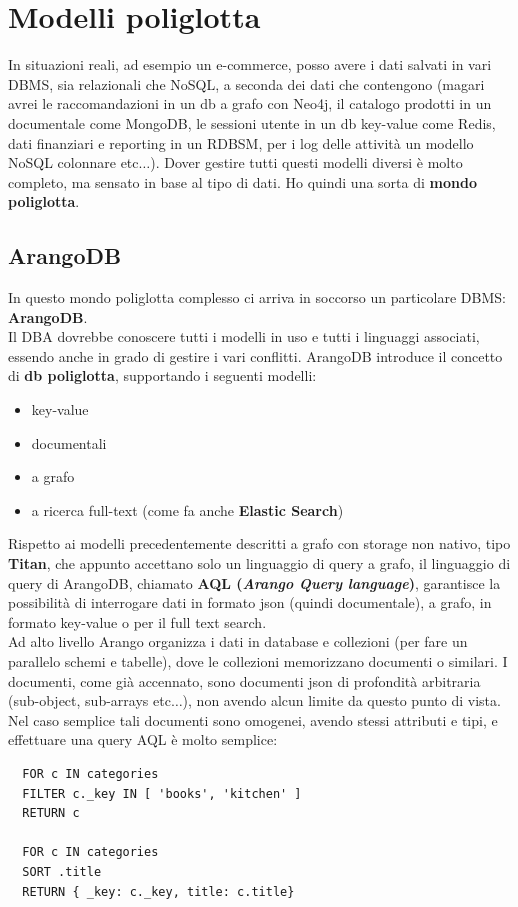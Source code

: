 \documentclass[a4paper,12pt, oneside]{book}
\begin{document}
\section{Modelli poliglotta}
In situazioni reali, ad esempio un e-commerce, posso avere i dati salvati in
vari DBMS, sia relazionali che NoSQL, a seconda dei dati che contengono (magari
avrei le raccomandazioni in un db a grafo con Neo4j, il catalogo prodotti in un
documentale come MongoDB, le sessioni utente in un db key-value come Redis,
dati finanziari e reporting in un RDBSM, per i log delle attività un modello
NoSQL colonnare etc$\ldots$). Dover gestire tutti questi modelli diversi è molto
completo, ma sensato in base al tipo di dati. Ho quindi una sorta di
\textbf{mondo poliglotta}.
\subsection{ArangoDB}
In questo mondo poliglotta complesso ci arriva in soccorso un particolare DBMS:
\textbf{ArangoDB}.\\
Il DBA dovrebbe conoscere tutti i modelli in uso e tutti i linguaggi associati,
essendo anche in grado di gestire i vari conflitti. ArangoDB introduce il
concetto di \textbf{db poliglotta}, supportando i seguenti modelli:
\begin{itemize}
  \item key-value
  \item documentali
  \item a grafo
  \item a ricerca full-text (come fa anche \textbf{Elastic Search})
\end{itemize}
Rispetto ai modelli precedentemente descritti a grafo con storage non nativo,
tipo \textbf{Titan}, che appunto accettano solo un linguaggio di query a grafo,
il linguaggio di query di ArangoDB, chiamato \textbf{AQL (\textit{Arango Query
    language})}, garantisce la possibilità di interrogare dati in formato json
(quindi documentale), a grafo, in formato key-value o per il full text search.\\
Ad alto livello Arango organizza i dati in database e collezioni (per fare un
parallelo schemi e tabelle), dove le collezioni memorizzano documenti o
similari. I documenti, come già accennato, sono documenti json di profondità
arbitraria (sub-object, sub-arrays etc$\ldots$), non avendo alcun limite da
questo punto di vista. Nel caso semplice tali documenti sono omogenei, avendo
stessi attributi e tipi, e effettuare una query AQL è molto semplice:
\begin{verbatim}
  FOR c IN categories
  FILTER c._key IN [ 'books', 'kitchen' ]
  RETURN c

  FOR c IN categories
  SORT .title
  RETURN { _key: c._key, title: c.title}
\end{verbatim}
\end{document}
